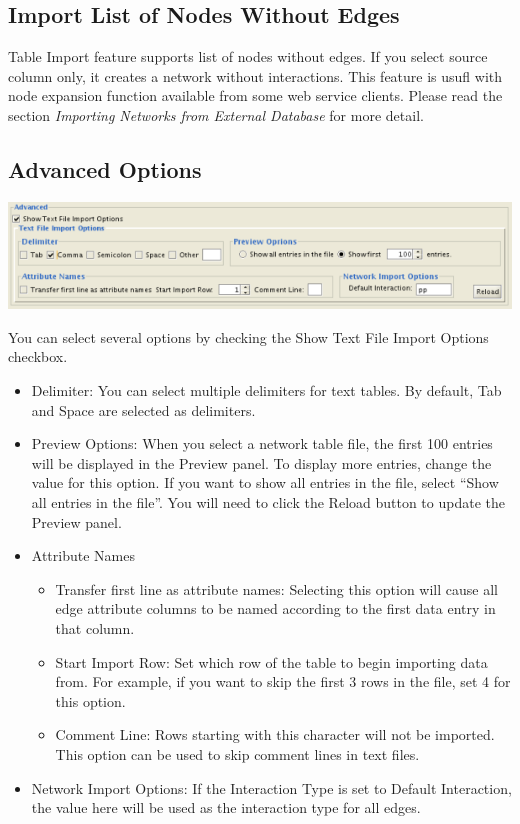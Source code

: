 \subsection{Import List of Nodes Without Edges}
 Table Import feature supports list of nodes without edges. If you select source column only, it creates a network without interactions. This feature is usufl with node expansion function available from some web service clients. Please read the section \emph{Importing Networks from External Database}
 for more detail. 

\subsection{Advanced Options}
\begin{center}
 \includegraphics[width=\textwidth]{images/network_import_advanced.png} 
\end{center}

 You can select several options by checking the Show Text File Import Options checkbox. 
\begin{itemize}
\item Delimiter: You can select multiple delimiters for text tables. By default, Tab and Space are selected as delimiters. 
\item Preview Options: When you select a network table file, the first 100 entries will be displayed in the Preview panel. To display more entries, change the value for this option. If you want to show all entries in the file, select ``Show all entries in the file''. You will need to click the Reload button to update the Preview panel. 
\item Attribute Names \begin{itemize}
\item Transfer first line as attribute names: Selecting this option will cause all edge attribute columns to be named according to the first data entry in that column. 
\item Start Import Row: Set which row of the table to begin importing data from. For example, if you want to skip the first 3 rows in the file, set 4 for this option. 
\item Comment Line: Rows starting with this character will not be imported. This option can be used to skip comment lines in text files. 
\end{itemize}
\item Network Import Options: If the Interaction Type is set to Default Interaction, the value here will be used as the interaction type for all edges. 
\end{itemize}
 
